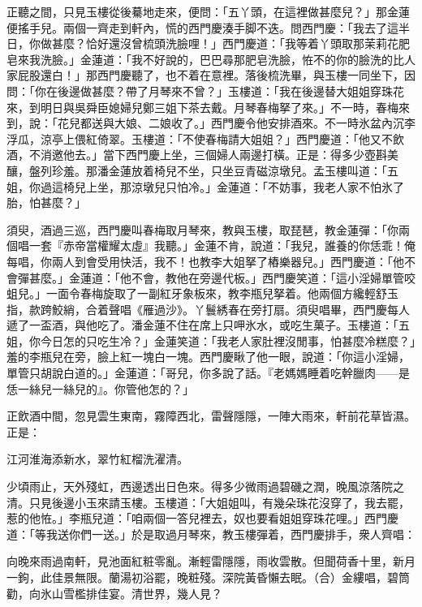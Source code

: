 正聽之間，只見玉樓從後驀地走來，便問：「五丫頭，在這裡做甚麼兒？」那金蓮便搖手兒。{}兩個一齊走到軒內，慌的西門慶湊手脚不迭。問西門慶：「我去了這半日，你做甚麼？恰好還沒曾梳頭洗臉哩！」西門慶道：「我等着丫頭取那茉莉花肥皂來我洗臉。」金蓮道：「我不好說的，巴巴尋那肥皂洗臉，恠不的你的臉洗的比人家屁股還白！」{}那西門慶聽了，也不着在意裡。落後梳洗畢，與玉樓一同坐下，因問：「你在後邊做甚麼？帶了月琴來不曾？」玉樓道：「我在後邊替大姐姐穿珠花來，到明日與吳舜臣媳婦兒鄭三姐下茶去戴。月琴春梅拏了來。」不一時，春梅來到，說：「花兒都送與大娘、二娘收了。」西門慶令他安排酒來。不一時氷盆內沉李浮瓜，涼亭上偎紅倚翠。玉樓道：「不使春梅請大姐姐？」西門慶道：「他又不飲酒，不消邀他去。」當下西門慶上坐，三個婦人兩邊打橫。正是：得多少壺斟美釀，盤列珍羞。那潘金蓮放着椅兒不坐，只坐豆青磁涼墩兒。孟玉樓叫道：「五姐，你過這椅兒上坐，那涼墩兒只怕冷。」金蓮道：「不妨事，我老人家不怕氷了胎，怕甚麼？」{}

須臾，酒過三巡，西門慶叫春梅取月琴來，教與玉樓，取琵琶，教金蓮彈：「你兩個唱一套『赤帝當權耀太虛』我聽。」金蓮不肯，說道：「我兒，誰養的你恁乖！俺每唱，你兩人到會受用快活，我不！也教李大姐拏了樁樂器兒。」{}西門慶道：「他不會彈甚麼。」金蓮道：「他不會，教他在旁邊代板。」西門慶笑道：「這小淫婦單管咬蛆兒。」一面令春梅旋取了一副紅牙象板來，教李瓶兒拏着。他兩個方纔輕舒玉指，款跨鮫綃，合着聲唱《雁過沙》。丫鬟綉春在旁打扇。須臾唱畢，西門慶每人遞了一盃酒，與他吃了。潘金蓮不住在席上只呷氷水，或吃生菓子。玉樓道：「五姐，你今日怎的只吃生冷？」金蓮笑道：「我老人家肚裡沒閒事，怕甚麼冷糕麼？」{}羞的李瓶兒在旁，臉上紅一塊白一塊。西門慶瞅了他一眼，說道：「你這小淫婦，單管只胡說白道的。」金蓮道：「哥兒，你多說了話。『老媽媽睡着吃幹臘肉——是恁一絲兒一絲兒的』。你管他怎的？」

正飲酒中間，忽見雲生東南，霧障西北，雷聲隱隱，一陣大雨來，軒前花草皆濕。正是：

\begin{myquote} 
江河淮海添新水，翠竹紅榴洗濯清。
\end{myquote} 

少頃雨止，天外殘虹，西邊透出日色來。得多少微雨過碧磯之潤，晚風涼落院之清。只見後邊小玉來請玉樓。玉樓道：「大姐姐叫，有幾朵珠花沒穿了，我去罷，惹的他恠。」李瓶兒道：「咱兩個一答兒裡去，奴也要看姐姐穿珠花哩。」西門慶道：「等我送你們一送。」於是取過月琴來，教玉樓彈着，西門慶排手，衆人齊唱：

\begin{myquote} 
向晚來雨過南軒，見池面紅粧零亂。漸輕雷隱隱，雨收雲散。但聞荷香十里，新月一鉤，此佳景無限。蘭湯初浴罷，晚粧殘。深院黃昏懶去眠。\markfont\small{（合）}金縷唱，碧筒勸，向氷山雪檻排佳宴。清世界，幾人見？
\end{myquote} 

